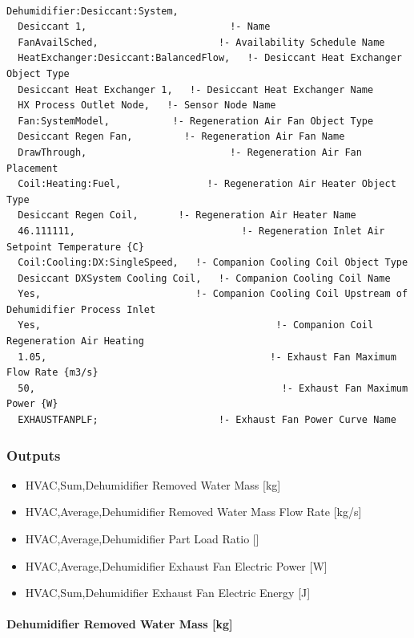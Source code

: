 \begin{lstlisting}

Dehumidifier:Desiccant:System,
  Desiccant 1,                         !- Name
  FanAvailSched,                     !- Availability Schedule Name
  HeatExchanger:Desiccant:BalancedFlow,   !- Desiccant Heat Exchanger Object Type
  Desiccant Heat Exchanger 1,   !- Desiccant Heat Exchanger Name
  HX Process Outlet Node,   !- Sensor Node Name
  Fan:SystemModel,           !- Regeneration Air Fan Object Type
  Desiccant Regen Fan,         !- Regeneration Air Fan Name
  DrawThrough,                         !- Regeneration Air Fan Placement
  Coil:Heating:Fuel,               !- Regeneration Air Heater Object Type
  Desiccant Regen Coil,       !- Regeneration Air Heater Name
  46.111111,                             !- Regeneration Inlet Air Setpoint Temperature {C}
  Coil:Cooling:DX:SingleSpeed,   !- Companion Cooling Coil Object Type
  Desiccant DXSystem Cooling Coil,   !- Companion Cooling Coil Name
  Yes,                           !- Companion Cooling Coil Upstream of Dehumidifier Process Inlet
  Yes,                                         !- Companion Coil Regeneration Air Heating
  1.05,                                       !- Exhaust Fan Maximum Flow Rate {m3/s}
  50,                                           !- Exhaust Fan Maximum Power {W}
  EXHAUSTFANPLF;                     !- Exhaust Fan Power Curve Name
\end{lstlisting}

\subsubsection{Outputs}\label{outputs-1-006}

\begin{itemize}
\item
  HVAC,Sum,Dehumidifier Removed Water Mass {[}kg{]}
\item
  HVAC,Average,Dehumidifier Removed Water Mass Flow Rate {[}kg/s{]}
\item
  HVAC,Average,Dehumidifier Part Load Ratio {[]}
\item
  HVAC,Average,Dehumidifier Exhaust Fan Electric Power {[}W{]}
\item
  HVAC,Sum,Dehumidifier Exhaust Fan Electric Energy {[}J{]}
\end{itemize}

\paragraph{Dehumidifier Removed Water Mass {[}kg{]}}\label{dehumidifier-removed-water-mass-kg-1}

